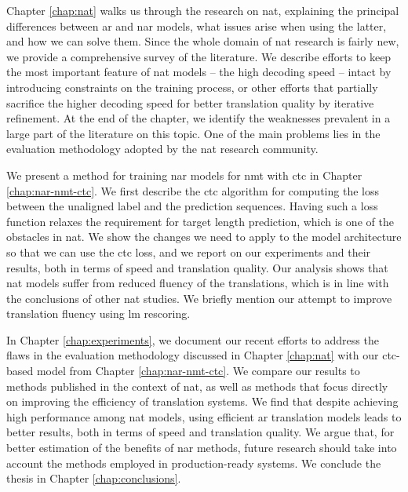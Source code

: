 Chapter \ref{chap:nat} walks us through the research on \ac{nat}, explaining
the principal differences between \acl{ar} and \acl{nar} models, what issues
arise when using the latter, and how we can solve them.  Since the whole domain
of \ac{nat} research is fairly new, we provide a comprehensive survey of the
literature. We describe efforts to keep the most important feature of \ac{nat}
models -- the high decoding speed -- intact by introducing constraints on the
training process, or other efforts that partially sacrifice the higher decoding
speed for better translation quality by iterative refinement. At the end of the
chapter, we identify the weaknesses prevalent in a large part of the literature
on this topic. One of the main problems lies in the evaluation methodology
adopted by the \ac{nat} research community.

We present a method for training \acl{nar} models for \ac{nmt} with \ac{ctc} in
Chapter \ref{chap:nar-nmt-ctc}. We first describe the \ac{ctc} algorithm for
computing the loss between the unaligned label and the prediction
sequences. Having such a loss function relaxes the requirement for target
length prediction, which is one of the obstacles in \ac{nat}. We show the
changes we need to apply to the model architecture so that we can use the
\ac{ctc} loss, and we report on our experiments and their results, both in
terms of speed and translation quality.  Our analysis shows that \ac{nat}
models suffer from reduced fluency of the translations, which is in line with
the conclusions of other \ac{nat} studies.  We briefly mention our attempt to
improve translation fluency using \acl{lm} rescoring.

In Chapter \ref{chap:experiments}, we document our recent efforts to address
the flaws in the evaluation methodology discussed in Chapter \ref{chap:nat}
with our \acs{ctc}-based model from Chapter \ref{chap:nar-nmt-ctc}. We compare
our results to methods published in the context of \ac{nat}, as well as methods
that focus directly on improving the efficiency of translation systems.  We
find that despite achieving high performance among \ac{nat} models, using
efficient \acl{ar} translation models leads to better results, both in terms of
speed and translation quality. We argue that, for better estimation of the
benefits of \acl{nar} methods, future research should take into account the
methods employed in production-ready systems.
%
We conclude the thesis in Chapter \ref{chap:conclusions}.

